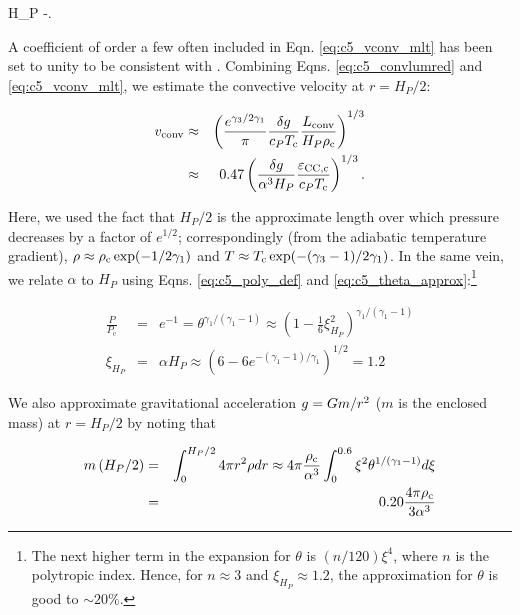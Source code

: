 \eqbegin
H_P \equiv -.
\label{eq:c5_scaleheight}
\eqend

\noindent A coefficient of order a few often included in Eqn. \ref{eq:c5_vconv_mlt} has been set to unity to be consistent with \citeal{piroc08}.  Combining Eqns. \ref{eq:c5_convlumred} and \ref{eq:c5_vconv_mlt}, we estimate the convective velocity at $r = H_P/2$:

\begin{eqnarray}
\vconv &\approx& \left(\frac{e^{\gamma_3/2\gamma_1}}{\pi}\frac{\delta \gacc}{c_P \Tc}\frac{\Lconv}{H_P \rhoc}\right)^{1/3} \nonumber \\
	&\approx& 0.47\left(\frac{\delta \gacc}{\alpha^3H_P}\frac{\epscentral}{c_P \Tc}\right)^{1/3}.
\label{eq:c5_vconvest}
\end{eqnarray}


\noindent Here, we used the fact that $H_P/2$ is the approximate length over which pressure decreases by a factor of $e^{1/2}$; correspondingly (from the adiabatic temperature gradient), $\rho \approx \rhoc\exp(-1/2\gamma_1)$ and $T \approx \Tc\exp(-(\gamma_3 - 1)/2\gamma_1)$.  In the same vein, we relate $\alpha$ to $H_P$ using Eqns. \ref{eq:c5_poly_def} and \ref{eq:c5_theta_approx}:\footnote{The next higher term in the expansion for $\theta$ is $(n/120)\xi^4$, where $n$ is the polytropic index.  Hence, for $n \approx 3$ and $\xi_{H_P} \approx 1.2$, the approximation for $\theta$ is good to $\sim20$\%.}

\begin{eqnarray}
\frac{P}{P_\mathrm{c}} &=& e^{-1} = \theta^{\gamma_1/(\gamma_1 - 1)} \approx \left(1 - \frac{1}{6}\xi_{H_P}^2\right)^{\gamma_1/(\gamma_1 - 1)}  \nonumber \\
\xi_{H_P} &=& \alpha H_P \approx \left(6 - 6e^{-(\gamma_1 - 1)/\gamma_1}\right)^{1/2} = 1.2
\label{eq:c5_poly_xihp2}
\end{eqnarray}

\noindent We also approximate gravitational acceleration $\gacc = Gm/r^2$ ($m$ is the enclosed mass) at $r = H_P/2$ by noting that

\begin{eqnarray}
m\left(H_P/2\right) &=& \int_0^{H_P/2} 4\pi r^2\rho dr \approx 4\pi\frac{\rhoc}{\alpha^3}\int_0^{0.6}\xi^2\theta^{1/(\gamma_1 - 1)}d\xi \nonumber \\
&=& 0.20\frac{4\pi\rhoc}{3\alpha^3} 
\label{eq:c5_poly_mhp2}
\end{eqnarray}

